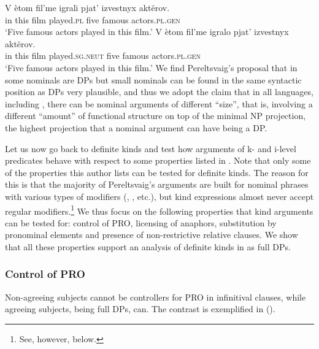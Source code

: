 \documentclass[output=paper
,modfonts
,nonflat]{langsci/langscibook}
\begin{document}
	\ea\label{ex:borik:15}
	\ea\label{ex:borik:15a}
	\gll V ètom fil'me igrali {\ob}pjat' izvestnyx akt\"erov{\cb}.\\
	in this  film played.\textsc{pl} {\db}five famous 	actors.\textsc{pl.gen}\\
	\glt `Five famous actors played in this film.'
	\ex\label{ex:borik:15b}
	\gll V ètom fil'me igralo {\ob}pjat' izvestnyx akt\"erov{\cb}.\\
	in this  film played.\textsc{sg.neut} {\db}five famous 	actors.\textsc{pl.gen}\\
	\glt `Five famous actors played in this film.'
	\z
	\z
	We find Pereltsvaig's proposal that in  some nominals are DPs but small nominals can be found in the same syntactic position as DPs very plausible, and thus we adopt the claim that in all languages, including , there can be nominal arguments of different ``size'', that is, involving a different ``amount'' of functional structure on top of the minimal NP projection, the highest projection that a nominal argument can have being a DP. 
	
	Let us now go back to definite kinds and test how arguments of k- and i-level predicates behave with respect to some properties listed in \citet{Pereltsvaig2006}. Note that only some of the properties this author lists can be tested for definite kinds. The reason for this is that the majority of Pereltsvaig's arguments are built for nominal phrases with various types of modifiers (, , etc.), but kind expressions almost never accept regular modifiers.\footnote{See, however,  below.} We thus focus on the following properties that kind arguments can be tested for: control of PRO, licensing of anaphors, substitution by pronominal elements and presence of non-restrictive relative clauses. We show that all these properties support an analysis of definite kinds in  as full DPs. 
	
	\subsubsection{Control of PRO}
	
	Non-agreeing subjects cannot be controllers for PRO in infinitival clauses, while agreeing subjects, being full DPs, can. The contrast is exemplified in  (\citealt[444, ex. 10a]{Pereltsvaig2006}).
	
\end{document}
